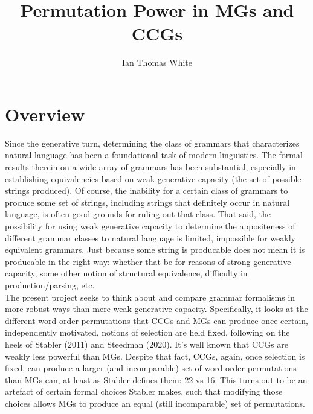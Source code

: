 \documentclass[12pt]{article}
\title{Permutation Power in MGs and CCGs}
\author{Ian Thomas White}
\date{}
\makeatletter
\renewcommand{\maketitle}
{
\begin{flushleft}
\textbf{{\large\@title}}
\newline
\@author
\end{flushleft}
}
\makeatother
\begin{document}
\thispagestyle{empty}
\maketitle
\tableofcontents
\newpage

\section{Overview}

\noindent Since the generative turn, determining the class of grammars that characterizes natural language has been a foundational task of modern linguistics. The formal results therein on a wide array of grammars has been substantial, especially in establishing equivalencies based on weak generative capacity (the set of possible strings produced). Of course, the inability for a certain class of grammars to produce some set of strings, including strings that definitely occur in natural language, is often good grounds for ruling out that class. That said, the possibility for using weak generative capacity to determine the appositeness of different grammar classes to natural language is limited, impossible for weakly equivalent grammars. Just because some string is producable does not mean it is producable in the right way: whether that be for reasons of strong generative capacity, some other notion of structural equivalence, difficulty in production/parsing, etc.\\

\noindent The present project seeks to think about and compare grammar formalisms in more robust ways than mere weak generative capacity. Specifically, it looks at the different word order permutations that CCGs and MGs can produce once certain, independently motivated, notions of selection are held fixed, following on the heels of Stabler (2011) and Steedman (2020). It's well known that CCGs are weakly less powerful than MGs. Despite that fact, CCGs, again, once selection is fixed, can produce a larger (and incomparable) set of word order permutations than MGs can, at least as Stabler defines them: 22 vs 16. This turns out to be an artefact of certain formal choices Stabler makes, such that modifying those choices allows MGs to produce an equal (still incomparable) set of permutations.\\
\end{document}
